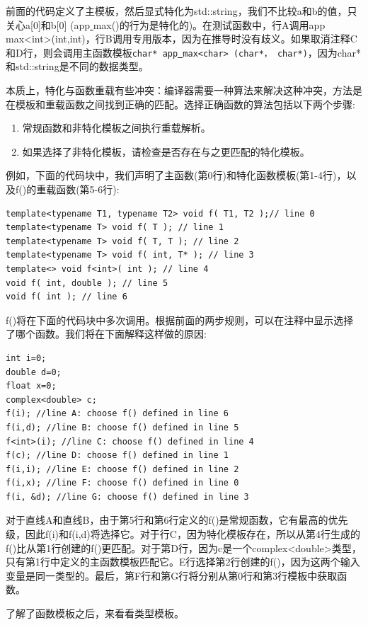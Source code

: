前面的代码定义了主模板，然后显式特化为std::string，我们不比较a和b的值，只关心a[0]和b[0] (app\underline{ }max()的行为是特化的)。在测试函数中，行A调用app\underline{ }max<int>(int,int)，行B调用专用版本，因为在推导时没有歧义。如果取消注释C和D行，则会调用主函数模板\texttt{char* app\underline{ }max<char> (char*， char*)}，因为char*和std::string是不同的数据类型。 \par
本质上，特化与函数重载有些冲突：编译器需要一种算法来解决这种冲突，方法是在模板和重载函数之间找到正确的匹配。选择正确函数的算法包括以下两个步骤: \par

\begin{enumerate}
	\item 常规函数和非特化模板之间执行重载解析。
	\item 如果选择了非特化模板，请检查是否存在与之更匹配的特化模板。
\end{enumerate}

例如，下面的代码块中，我们声明了主函数(第0行)和特化函数模板(第1-4行)，以及f()的重载函数(第5-6行): \par

\begin{lstlisting}[caption={}]
template<typename T1, typename T2> void f( T1, T2 );// line 0
template<typename T> void f( T ); // line 1
template<typename T> void f( T, T ); // line 2
template<typename T> void f( int, T* ); // line 3
template<> void f<int>( int ); // line 4
void f( int, double ); // line 5
void f( int ); // line 6
\end{lstlisting}

f()将在下面的代码块中多次调用。根据前面的两步规则，可以在注释中显示选择了哪个函数。我们将在下面解释这样做的原因: \par

\begin{lstlisting}[caption={}]
int i=0;
double d=0;
float x=0;
complex<double> c;
f(i); //line A: choose f() defined in line 6
f(i,d); //line B: choose f() defined in line 5
f<int>(i); //line C: choose f() defined in line 4
f(c); //line D: choose f() defined in line 1
f(i,i); //line E: choose f() defined in line 2
f(i,x); //line F: choose f() defined in line 0
f(i, &d); //line G: choose f() defined in line 3
\end{lstlisting}

对于直线A和直线B，由于第5行和第6行定义的f()是常规函数，它有最高的优先级，因此f(i)和f(i,d)将选择它。对于行C，因为特化模板存在，所以从第4行生成的f()比从第1行创建的f()更匹配。对于第D行，因为c是一个complex<double>类型，只有第1行中定义的主函数模板匹配它。E行选择第2行创建的f()，因为这两个输入变量是同一类型的。最后，第F行和第G行将分别从第0行和第3行模板中获取函数。 \par
了解了函数模板之后，来看看类型模板。 \par

